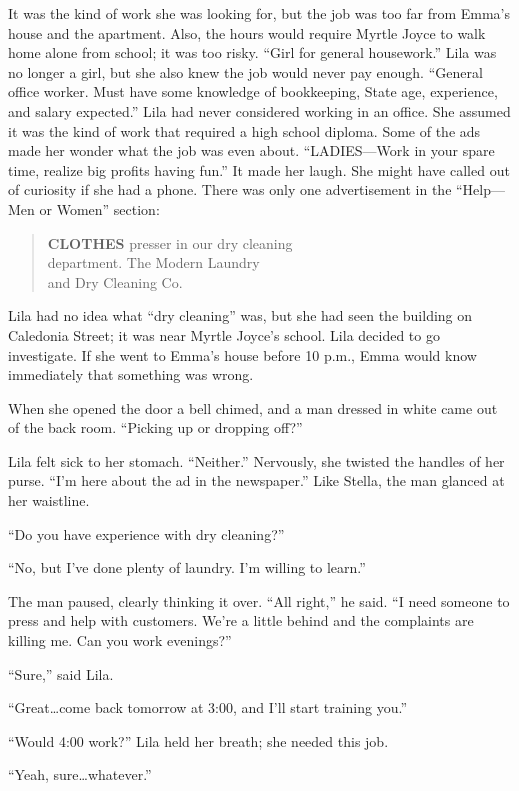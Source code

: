 \documentclass[
  letterpaper,
]{book}
\begin{document}
It was the kind of work she was looking for, but the job was too far
from Emma's house and the apartment. Also, the hours would require
Myrtle Joyce to walk home alone from school; it was too risky. ``Girl
for general housework.'' Lila was no longer a girl, but she also knew
the job would never pay enough. ``General office worker. Must have some
knowledge of bookkeeping, State age, experience, and salary expected.''
Lila had never considered working in an office. She assumed it was the
kind of work that required a high school diploma. Some of the ads made
her wonder what the job was even about. ``LADIES---Work in your spare
time, realize big profits having fun.'' It made her laugh. She might
have called out of curiosity if she had a phone. There was only one
advertisement in the ``Help---Men or Women'' section:

\begin{quote}
\textbf{CLOTHES} presser in our dry cleaning\\
department. The Modern Laundry\\
and Dry Cleaning Co.~
\end{quote}

Lila had no idea what ``dry cleaning'' was, but she had seen the
building on Caledonia Street; it was near Myrtle Joyce's school. Lila
decided to go investigate. If she went to Emma's house before 10 p.m.,
Emma would know immediately that something was wrong.

When she opened the door a bell chimed, and a man dressed in white came
out of the back room. ``Picking up or dropping off?''

Lila felt sick to her stomach. ``Neither.'' Nervously, she twisted the
handles of her purse. ``I'm here about the ad in the newspaper.'' Like
Stella, the man glanced at her waistline.

``Do you have experience with dry cleaning?''

``No, but I've done plenty of laundry. I'm willing to learn.''

The man paused, clearly thinking it over. ``All right,'' he said. ``I
need someone to press and help with customers. We're a little behind and
the complaints are killing me. Can you work evenings?''

``Sure,'' said Lila.

``Great\ldots come back tomorrow at 3:00, and I'll start training you.''

``Would 4:00 work?'' Lila held her breath; she needed this job.

``Yeah, sure\ldots whatever.''
\end{document}

